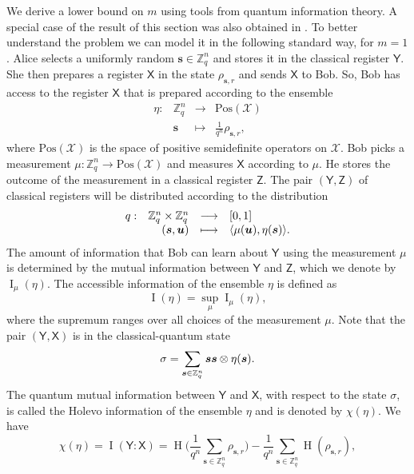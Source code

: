 \documentclass[11pt]{article}
\theoremstyle{plain}
\theoremstyle{definition}
\DeclareMathOperator{\entpy}{H}
\let\ket\relax
\DeclarePairedDelimiter{\ket}{\lvert}{\rangle}
\let\bra\relax
\DeclarePairedDelimiter{\bra}{\langle}{\rvert}
\DeclarePairedDelimiter{\lrang}{\langle}{\rangle}
\def\Z{\mathbb{Z}}
\def\X{\mathcal{X}}
\def\PosSemi{\mathrm{Pos}}
\begin{document}
We derive a lower bound on $m$ using tools from quantum information theory. A special case of the result of this section was also obtained in \cite{bacon2005optimal}. To better understand the problem we can model it in the following standard way, for $m = 1$. Alice selects a uniformly random $\bm{s} \in \Z_q^n$ and stores it in the classical register $\mathsf{Y}$. She then prepares a register $\mathsf{X}$ in the state $\rho_{\bm{s}, r}$ and sends $\mathsf{X}$ to Bob. So, Bob has access to the register $\mathsf{X}$ that is prepared according to the ensemble
\[
\begin{array}{rrll}
    \eta: & \Z_q^n & \longrightarrow & \mathrm{Pos}(\X) \\
    & \bm{s} & \longmapsto & \frac{1}{q^n}\rho_{\bm{s}, r},
\end{array}
\]
where $\PosSemi(\X)$ is the space of positive semidefinite operators on $\X$. Bob picks a measurement $\mu: \Z_q^n \rightarrow \mathrm{Pos}(\X)$ and measures $\mathsf{X}$ according to $\mu$. He stores the outcome of the measurement in a classical register $\mathsf{Z}$. The pair $(\mathsf{Y}, \mathsf{Z})$ of classical registers will be distributed according to the distribution
\[
\begin{array}{rrll}
    q: & \Z_q^n \times \Z_q^n & \longrightarrow & [0, 1] \\
    & (\bm{s}, \bm{u}) & \longmapsto & \lrang{\mu(\bm{u}), \eta(\bm{s})}.
\end{array}
\]
The amount of information that Bob can learn about $\mathsf{Y}$ using the measurement $\mu$ is determined by the mutual information between $\mathsf{Y}$ and $\mathsf{Z}$, which we denote by $\operatorname{I}_\mu(\eta)$. The accessible information of the ensemble $\eta$ is defined as
\[ \operatorname{I}(\eta) = \sup_{\mu} \operatorname{I}_\mu(\eta), \]
where the supremum ranges over all choices of the measurement $\mu$. Note that the pair $(\mathsf{Y}, \mathsf{X})$ is in the classical-quantum state
\[ \sigma = \sum_{\bm{s} \in \Z_q^n} \ket{\bm{s}}\bra{\bm{s}} \otimes \eta(\bm{s}). \]
The quantum mutual information between $\mathsf{Y}$ and $\mathsf{X}$, with respect to the state $\sigma$, is called the Holevo information of the ensemble $\eta$ and is denoted by $\chi(\eta)$. We have
\begin{equation}
    \label{equ:holevo-chi}
    \chi(\eta) = \operatorname{I}(\mathsf{Y} : \mathsf{X}) = \entpy\Bigg( \frac{1}{q^n} \sum_{\bm{s} \in \Z_q^n} \rho_{\bm{s}, r} \Bigg) - \frac{1}{q^n} \sum_{\bm{s} \in \Z_q^n} \entpy(\rho_{\bm{s}, r}),
\end{equation}
\end{document}
